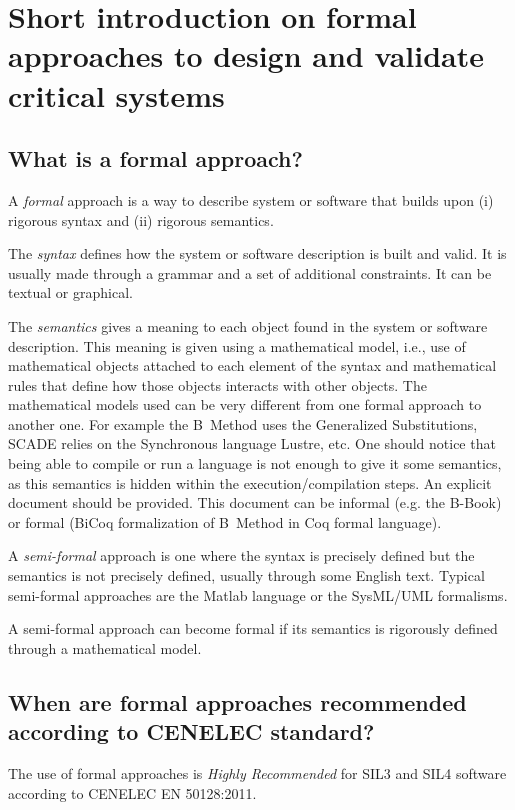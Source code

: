

\section{Short introduction on formal approaches to  design and validate critical systems}

\subsection{What is a formal approach?}

A \emph{formal} approach is a way to describe system or software
that builds upon (i) rigorous syntax and (ii) rigorous semantics.

The \emph{syntax} defines how the system or software description is
built and valid. It is usually made through a grammar and a set of
additional constraints. It can be textual or graphical.

The \emph{semantics} gives a meaning to each object found in the
system or software description. This meaning is given using a
mathematical model, i.e., use of mathematical objects attached to each
element of the syntax and mathematical rules that define how those
objects interacts with other objects. The mathematical models used can
be very different from one formal approach to another one. For example
the B~Method uses the Generalized Substitutions, SCADE relies on the
Synchronous language Lustre, etc. One should notice that being able to
compile or run a language is not enough to give it some semantics, as
this semantics is hidden within the execution/compilation steps. An
explicit document should be provided. This document can be informal
(e.g. the B-Book) or formal (BiCoq formalization of B~Method in Coq
formal language).

A \emph{semi-formal} approach is one where the syntax is precisely
defined but the semantics is not precisely defined, usually through some
English text. Typical semi-formal approaches are the Matlab language or
the SysML/UML formalisms.

A semi-formal approach can become formal if its semantics is
rigorously defined through a mathematical model.

\subsection{When are formal approaches recommended according to CENELEC standard?}

The use of formal approaches is \emph{Highly Recommended} for SIL3 and
SIL4 software according to CENELEC EN 50128:2011.

